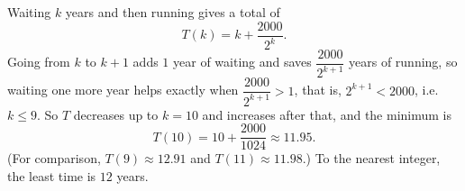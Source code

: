 Waiting $k$ years and then running gives a total of
\[T(k)=k+\dfrac{2000}{2^k}.\]
Going from $k$ to $k+1$ adds $1$ year of waiting and saves $\dfrac{2000}{2^{k+1}}$ years of running, so waiting one more year helps exactly when $\dfrac{2000}{2^{k+1}}>1$, that is, $2^{k+1}<2000$, i.e. $k\le9$. So $T$ decreases up to $k=10$ and increases after that, and the minimum is
\[T(10)=10+\dfrac{2000}{1024}\approx11.95 .\]
(For comparison, $T(9)\approx12.91$ and $T(11)\approx11.98$.) To the nearest integer, the least time is $\boxed{12}$ years.
